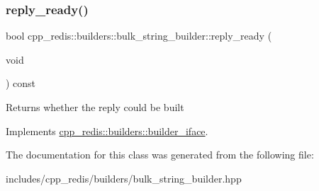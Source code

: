 \subsubsection{\texorpdfstring{reply\+\_\+ready()}{reply\_ready()}}
{\footnotesize\ttfamily bool cpp\+\_\+redis\+::builders\+::bulk\+\_\+string\+\_\+builder\+::reply\+\_\+ready (\begin{DoxyParamCaption}\item[{void}]{ }\end{DoxyParamCaption}) const\hspace{0.3cm}{\ttfamily [virtual]}}

\begin{DoxyReturn}{Returns}
whether the reply could be built 
\end{DoxyReturn}


Implements \mbox{\hyperlink{classcpp__redis_1_1builders_1_1builder__iface_a40db9a31d4ea1771777e74146d31e12d}{cpp\+\_\+redis\+::builders\+::builder\+\_\+iface}}.



The documentation for this class was generated from the following file\+:\begin{DoxyCompactItemize}
\item 
includes/cpp\+\_\+redis/builders/bulk\+\_\+string\+\_\+builder.\+hpp\end{DoxyCompactItemize}
